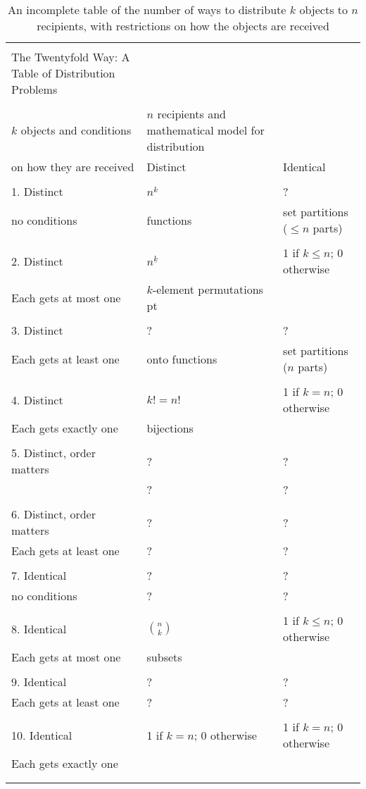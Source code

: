 \documentclass[10pt,]{book}
\theoremstyle{plain}
\theoremstyle{definition}
\numberwithin{equation}{chapter}
\newcommand{\hrulethin}  {\noalign{\hrule height 0.04em}}
\newcommand{\hrulemedium}{\noalign{\hrule height 0.07em}}
\begin{document}
\begin{table}
\centering
\begin{tabular}{lll}
&&\tabularnewline\hrulethin
The Twentyfold Way: A Table of Distribution Problems\tabularnewline[0pt]
&&\tabularnewline\hrulemedium
\(k\) objects and conditions&\(n\) recipients and mathematical model for distribution\tabularnewline[0pt]
on how they are received&Distinct&Identical\tabularnewline[0pt]
&&\tabularnewline\hrulemedium
1.  Distinct&\(n^k\)&?\tabularnewline[0pt]
no conditions&functions&set partitions (\(\le n\) parts)\tabularnewline[0pt]
&&\tabularnewline\hrulethin
2.  Distinct&\(n^{\underline{k}}\)&1 if \(k\le n\); 0 otherwise\tabularnewline[0pt]
Each gets at most one&\kern -2pt \(k\)-element permutations\kern -2 pt&\tabularnewline[0pt]
&&\tabularnewline\hrulethin
3.  Distinct&?&?\tabularnewline[0pt]
Each gets at least one&onto functions&set partitions (\(n\) parts)\tabularnewline[0pt]
&&\tabularnewline\hrulethin
4. Distinct&\(k!=n!\)&1 if \(k=n\); 0 otherwise\tabularnewline[0pt]
Each gets exactly one&bijections&\tabularnewline[0pt]
&&\tabularnewline\hrulethin
5.  Distinct, order matters&?&?\tabularnewline[0pt]
&?&?\tabularnewline[0pt]
&&\tabularnewline\hrulethin
6.  Distinct, order matters&?&?\tabularnewline[0pt]
Each gets at least one&?&?\tabularnewline[0pt]
&&\tabularnewline\hrulethin
7.  Identical&?&?\tabularnewline[0pt]
no conditions&?&?\tabularnewline[0pt]
&&\tabularnewline\hrulethin
8.  Identical&\(\binom{n}{k}\)&1 if \(k\le n\); 0 otherwise\tabularnewline[0pt]
Each gets at most one&subsets&\tabularnewline[0pt]
&&\tabularnewline\hrulethin
9.  Identical&?&?\tabularnewline[0pt]
Each gets at least one&?&?\tabularnewline[0pt]
&&\tabularnewline\hrulethin
10.  Identical&1 if \(k=n\); 0 otherwise&1 if \(k=n\); 0 otherwise\tabularnewline[0pt]
Each gets exactly one&&\tabularnewline[0pt]
&&\tabularnewline\hrulethin
\end{tabular}
\caption{An incomplete table of the number of ways to distribute \(k\) objects to \(n\) recipients, with restrictions on how the objects are received\label{firstdistributiontable}}
\end{table}
\end{document}
